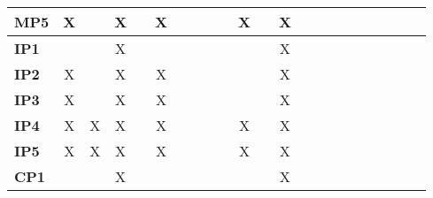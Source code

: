\documentclass[12pt]{article}
\begin{document}
\begin{table}[H]
\begin{adjustwidth}{-0.8in}{-1.2in}
{\begin{tabular}{c|c|c|c|c|c|c|c|c|c|c|c|c|c|c|c|c|c|c|c|c|c}
\multicolumn{1}{|l|}{\textbf{MP5}}   &      X       &              &      X       &              &      X       &              &              &              &              &      X       &              &      X       &              &              &             &              &             &             &             &             \\ \hline
\multicolumn{1}{|l|}{\textbf{IP1}}   &              &              &      X       &              &              &              &              &              &              &              &              &      X       &              &              &             &              &             &             &             &             \\ \hline
\multicolumn{1}{|l|}{\textbf{IP2}}   &      X       &              &      X       &              &      X       &              &              &              &              &              &              &      X       &              &              &             &              &             &             &             &             \\ \hline
\multicolumn{1}{|l|}{\textbf{IP3}}   &      X       &              &      X       &              &      X       &              &              &              &              &              &              &      X       &              &              &             &              &             &             &             &             \\ \hline
\multicolumn{1}{|l|}{\textbf{IP4}}   &      X       &       X      &      X       &              &      X       &              &              &              &              &      X       &              &      X       &              &              &             &              &             &             &             &             \\ \hline
\multicolumn{1}{|l|}{\textbf{IP5}}   &      X       &       X      &      X       &              &      X       &              &              &              &              &      X       &              &      X       &              &              &             &              &             &             &             &             \\ \hline
\multicolumn{1}{|l|}{\textbf{CP1}}   &              &              &      X       &              &              &              &              &              &              &              &              &      X       &              &              &             &              &             &             &             &             \\ \hline

\end{tabular}}
\end{adjustwidth}
\end{table}
\end{document}
